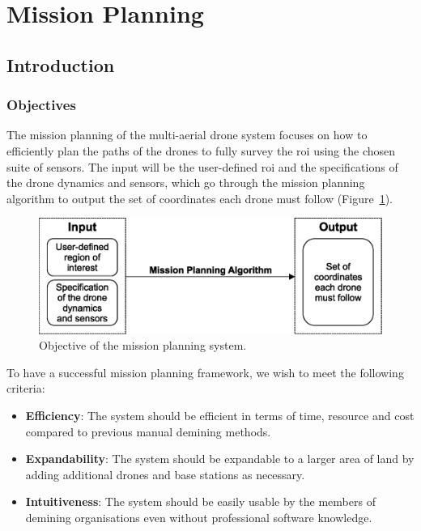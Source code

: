\newpage
{}
\section{Mission Planning} \label{sec:msp}

\subsection{Introduction}
\label{sec:msp_introduction}

\subsubsection{Objectives}

The mission planning of the multi-aerial drone system focuses on how to efficiently plan the paths of the drones to fully survey the \gls{roi} using the chosen suite of sensors. The input will be the user-defined \gls{roi} and the specifications of the drone dynamics and sensors, which go through the mission planning algorithm to output the set of coordinates each drone must follow (Figure~\ref{fig:msp_objective}).

\begin{figure}[h!]
    \centering
    \includegraphics[width=0.7\linewidth]{figs/Jihwan/Objective of the Mission Planning System.eps}
    \caption[Objective of the Mission Planning System]
    {Objective of the mission planning system.}
    \label{fig:msp_objective}
\end{figure}

To have a successful mission planning framework, we wish to meet the following criteria:

\begin{itemize}
    \item \textbf{Efficiency}: The system should be efficient in terms of time, resource and cost compared to previous manual demining methods. 
    \item \textbf{Expandability}: The system should be expandable to a larger area of land by adding additional drones and base stations as necessary. 
    \item \textbf{Intuitiveness}: The system should be easily usable by the members of demining organisations even without professional software knowledge. 
\end{itemize}

